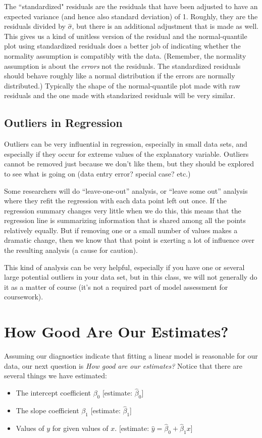 \documentclass[twoside]{book}\usepackage[]{graphicx}\usepackage[]{xcolor}
\newenvironment{knitrout}{}{} %
\begin{document}
\begin{knitrout}
{}



\end{knitrout}
\noindent
The ``standardized" residuals are the residuals that have been adjusted to
have an expected variance (and hence also standard deviation) of 1.  Roughly,
they are the residuals divided by $\hat \sigma$, but there is an additional 
adjustment that is made as well.  This gives us a kind of unitless version
of the residual and the normal-quantile plot using standardized residuals does a 
better job of indicating whether the normality assumption is compatibly with
the data.  (Remember, the normality assumption is about the \emph{errors} not 
the residuals.  The standardized residuals should behave roughly like a normal
distribution if the errors are normally distributed.)  Typically the shape of
the normal-quantile plot made with raw residuals and the one made with standarized
residuals will be very similar.

\subsection{Outliers in Regression}

Outliers can be very influential in regression, especially in small data sets,
and especially if they occur for extreme values of the explanatory variable.
Outliers cannot be removed just because we don't like them, but they should be
explored to see what is going on (data entry error? special case? etc.)

Some researchers will do ``leave-one-out'' analysis, or ``leave some out'' analysis
where they refit the regression with each data point left out once.  If the regression summary changes very little when we do this, this means that the regression line
is summarizing information that is shared among all the points relatively equally.
But if removing one or a small number of values makes a dramatic change, then
we know that that point is exerting a lot of influence over the resulting
analysis (a cause for caution).   

This kind of analysis can be very helpful, especially if you have one or several large potential outliers in your data set, but in this class, we will not generally do it as a matter of course (it's not a required part of model assessment for coursework).

\section{How Good Are Our Estimates?}
Assuming our diagnostics indicate that fitting a linear model is reasonable for our data,
our next question is \emph{How good are our estimates?}
Notice that there are several things we have estimated:
\begin{itemize}
	\item The intercept coefficient $\beta_0$ 
		[estimate: $\hat \beta_0$]
	\item The slope coefficient $\beta_1$ 
		[estimate: $\hat \beta_1$]
	\item Values of $y$ for given values of $x$. 
		[estimate: $\hat y = \hat \beta_0 + \hat \beta_1 x$]
\end{itemize}
\end{document}
